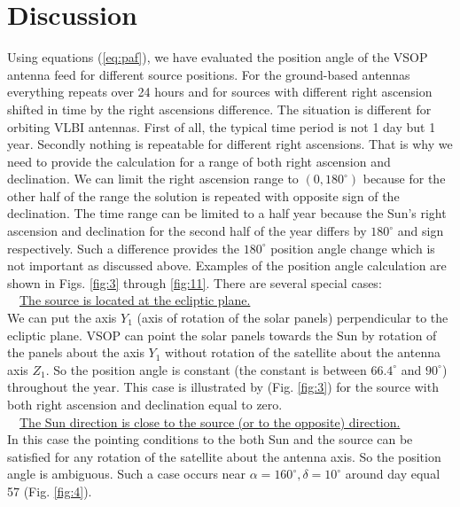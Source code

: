 \section{Discussion}
Using equations (\ref{eq:paf}), we have evaluated the position angle of the VSOP antenna feed for different source positions. For the ground-based antennas everything repeats over 24 hours and for sources with different right ascension  shifted in time by the right ascensions difference. The situation is different for orbiting VLBI antennas. First of all, the typical time period is not 1 day  but 1 year. Secondly nothing is repeatable for different right ascensions. That is why we need to provide the calculation for a range of both right ascension and declination. We can limit the right ascension range to $(0, 180^\circ)$ because for the other half of the range the solution is repeated with opposite sign of the declination.
The time range can be limited to a half year because the Sun's right ascension and declination for the second half of the year differs by $180^\circ$ and sign respectively. Such a difference provides the $180^\circ$ position angle change which is not important as discussed above. Examples of the position angle calculation are shown in Figs. \ref{fig:3} through \ref{fig:11}. There are several special cases:\\
~~\underline {The source is located at the ecliptic plane.}\\
We can put the axis $Y_1$ (axis of rotation of the solar panels) perpendicular to the ecliptic plane. VSOP can point the solar panels towards the Sun by rotation of the panels about the axis $Y_1$ without rotation of the satellite about the antenna axis $Z_1$. So the position angle is constant (the constant is between $66.4^\circ $ and $90^\circ $) throughout the year. This case is illustrated by  (Fig. \ref{fig:3}) for the source with both right ascension and declination equal to zero.\\
~~\underline {The Sun direction is close to the source (or to the opposite) direction.}\\
In this case the pointing conditions to the both Sun and the source can be satisfied for any rotation of the satellite about the antenna axis. So the position angle is ambiguous. Such a case occurs near $\alpha=160^\circ, \delta=10^\circ$ around day equal 57 (Fig. \ref{fig:4}).\\


\def\plotone#1{\begin{picture}(15,10)(-5, -0.5)
                  \centering \leavevmode
                  \epsfysize=10\unitlength \epsfbox{#1}
               \end{picture}}

